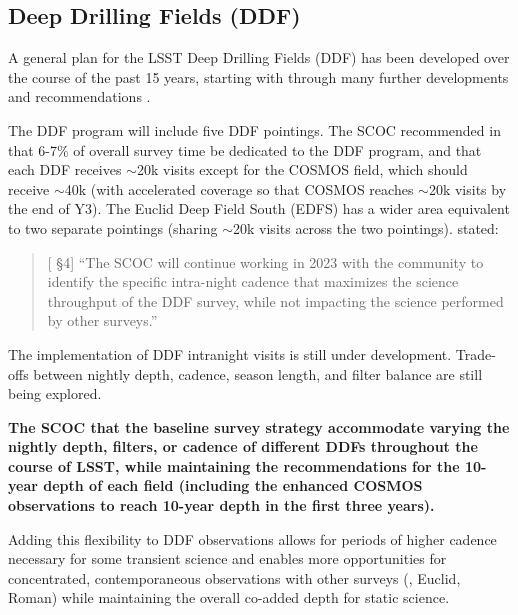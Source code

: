 \subsection{Deep Drilling Fields (DDF)}\label{sec:DDF}

A general plan for the LSST Deep Drilling Fields (DDF) has been developed over the course of the past 15 years, starting with \cite{2009arXiv0912.0201L} through many further developments and recommendations \citep[\eg ,][]{Brandt:2018,Scolnic:2018,Yu:2020,Kovacevic:2022,Czerny:2023,Zhang:2023,Gris:2023,Gris:2024,PozoNunez:2024}.

The DDF program will include
five DDF pointings. The SCOC recommended in  that  
6-7\% of overall survey time be dedicated to the DDF program, and that each DDF receives $\sim$20k visits
except for the COSMOS field, which should receive $\sim$40k (with accelerated coverage so that COSMOS reaches $\sim$20k visits by the end of Y3). The Euclid Deep Field South (EDFS) has a wider area equivalent to two separate pointings (sharing $\sim$20k visits across the two pointings).  stated: 
\begin{quote}
    {[ \S4] ``The SCOC will continue working in 2023 with the community to identify the specific intra-night cadence that maximizes the science throughput of the DDF survey, while not impacting the science performed by other surveys.''}
\end{quote}


The implementation of DDF intranight visits is still under development. Trade-offs between nightly depth, cadence, season length, and filter balance are still being explored.

{\bf The SCOC that the baseline survey strategy accommodate varying the nightly depth, filters, or cadence of different DDFs throughout the course of LSST, while maintaining the  recommendations for the 10-year depth of each field (including the enhanced COSMOS observations to reach 10-year depth in the first three years).}

Adding this flexibility to DDF observations allows for periods of higher cadence necessary for some transient science \citep[\eg, AGN or supernovae;][]{Yu:2020,Kovacevic:2022,Czerny:2023,PozoNunez:2024,Gris:2023,Gris:2024} and enables more opportunities for concentrated, contemporaneous observations with other surveys (\eg , Euclid, Roman) while maintaining the overall co-added depth for static science.

